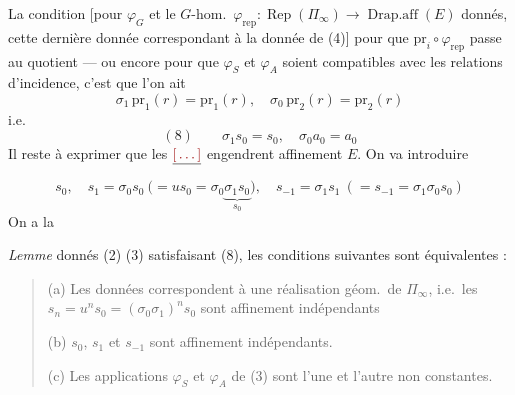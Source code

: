 \documentclass[11pt,a4paper]{article}
\begin{document}


La condition [pour $\varphi_G$  et le $G$-hom.\ $\varphi_{\mathrm{rep}} : \operatorname{Rep}(\Pi_\infty) \to \operatorname{Drap.aff}(E)$ donnés, cette dernière donnée correspondant à la donnée  de (4)] pour que $\mathrm{pr}_i \circ \varphi_{\mathrm{rep}}$ passe au quotient — ou encore pour que $\varphi_S$ et $\varphi_A$ soient compatibles avec les relations d'incidence, c'est que l'on ait
\[
\sigma_1\, \mathrm{pr}_1(r) = \mathrm{pr}_1(r), \quad \sigma_0\, \mathrm{pr}_2(r) = \mathrm{pr}_2(r)
\]
i.e.
\[
(8) \qquad \boxed{\sigma_1 s_0 = s_0, \quad \sigma_0 a_0 = a_0}
\]
Il reste à exprimer que les $\uncertain{\ill{}}$ engendrent affinement $E$. On va introduire

\[
s_0, \quad s_1 = \sigma_0 s_0\ \bigl(= u s_0 = \sigma_0 \underbrace{\sigma_1 s_0}_{s_0}\bigr), \quad
s_{-1} = \sigma_1 s_1\ (= s_{-1} = \sigma_1 \sigma_0 s_0)
\]
On a la

\emph{Lemme}  donnés (2) (3) satisfaisant (8), les conditions suivantes sont équivalentes :
\begin{quote}
(a) Les données correspondent à une réalisation géom.\ de $\Pi_\infty$, i.e.\ les $s_n = u^{n} s_0 = (\sigma_0\sigma_1)^{n} s_0$ sont affinement indépendants

(b) $s_0$, $s_1$ et $s_{-1}$ sont affinement indépendants.

(c) Les applications $\varphi_S$ et $\varphi_A$ de (3) sont l'une et l'autre non constantes.
\end{quote}
\end{document}
